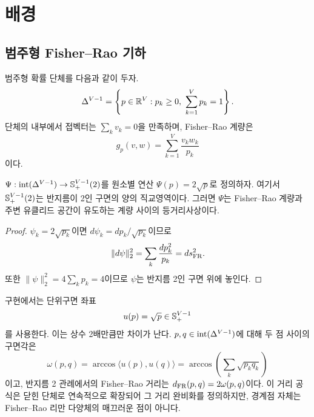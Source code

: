 \section{배경}

\subsection{범주형 Fisher--Rao 기하}

범주형 확률 단체를 다음과 같이 두자.
\begin{equation}
  \simplex
  = \left\{p\in\mathbb{R}^{V}: p_k\ge 0,\ \sum_{k=1}^{V}p_k=1\right\}.
\end{equation}
단체의 내부에서 접벡터는 $\sum_k v_k=0$을 만족하며, Fisher--Rao 계량은
\begin{equation}
  g_p(v,w)=\sum_{k=1}^{V}\frac{v_kw_k}{p_k}
  \label{eq:fisher_metric}
\end{equation}
이다.

\begin{proposition}
$\Psi:\operatorname{int}(\Delta^{V-1})\rightarrow\mathbb{S}^{V-1}_{+}(2)$를 원소별 연산
$\Psi(p)=2\sqrt{p}$로 정의하자. 여기서 $\mathbb{S}^{V-1}_{+}(2)$는 반지름이 2인 구면의 양의
직교영역이다. 그러면 $\Psi$는 Fisher--Rao 계량과 주변 유클리드 공간이 유도하는 계량 사이의
등거리사상이다.
\end{proposition}

\begin{proof}
$\psi_k=2\sqrt{p_k}$이면 $d\psi_k=dp_k/\sqrt{p_k}$이므로
\begin{equation}
  \lVert d\psi\rVert_2^2
  =\sum_k\frac{dp_k^2}{p_k}
  =ds_{\mathrm{FR}}^2.
\end{equation}
또한 $\lVert\psi\rVert_2^2=4\sum_k p_k=4$이므로 $\psi$는 반지름 2인 구면 위에 놓인다.
\end{proof}

구현에서는 단위구면 좌표
\begin{equation}
  u(p)=\sqrt{p}\in\mathbb{S}^{V-1}_{+}
  \label{eq:sqrt_map}
\end{equation}
를 사용한다. 이는 상수 2배만큼만 차이가 난다.
$p,q\in\operatorname{int}(\Delta^{V-1})$에 대해 두 점 사이의 구면각은
\begin{equation}
  \omega(p,q)
  =\arccos\langle u(p),u(q)\rangle
  =\arccos\left(\sum_k\sqrt{p_kq_k}\right)
  \label{eq:bhattacharyya_angle}
\end{equation}
이고, 반지름 2 관례에서의 Fisher--Rao 거리는 $d_{\mathrm{FR}}(p,q)=2\omega(p,q)$이다.
이 거리 공식은 닫힌 단체로 연속적으로 확장되어 그 거리 완비화를 정의하지만, 경계점 자체는
Fisher--Rao 리만 다양체의 매끄러운 점이 아니다.

